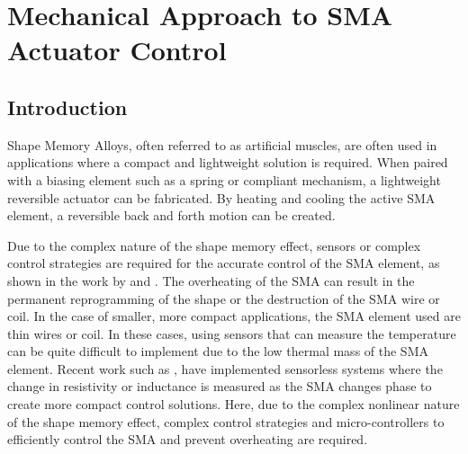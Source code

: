
\chapter{Mechanical Approach to SMA Actuator Control}\label{chap:integrated-control}


\section{Introduction}
Shape Memory Alloys, often referred to as artificial muscles, are often used in applications where a compact and lightweight solution is required. When paired with a biasing element such as a spring or compliant mechanism, a lightweight reversible actuator can be fabricated. By heating and cooling the active SMA element, a reversible back and forth motion can be created.

Due to the complex nature of the shape memory effect, sensors or complex control strategies are required for the accurate control of the SMA element, as shown in the work by \todocite and \todocite. The overheating of the SMA can result in the permanent reprogramming of the shape or the destruction of the SMA wire or coil. In the case of smaller, more compact applications, the SMA element used are thin wires or coil. In these cases, using sensors that can measure the temperature can be quite difficult to implement due to the low thermal mass of the SMA element. Recent work such as \todocite, have implemented sensorless systems where the change in resistivity or inductance is measured as the SMA changes phase to create more compact control solutions. Here, due to the complex nonlinear nature of the shape memory effect, complex control strategies and micro-controllers to efficiently control the SMA and prevent overheating are required.

